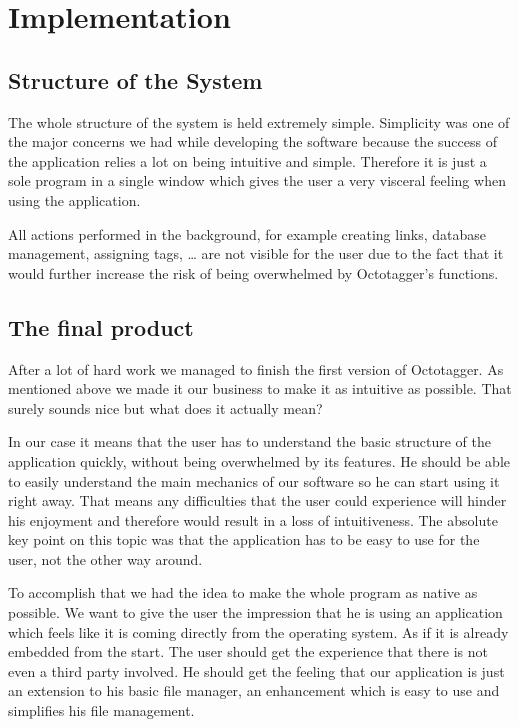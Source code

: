 \section{Implementation}
\def \kapitelautor {Christoph Führer}

\subsection{Structure of the System}
The whole structure of the system is held extremely simple. Simplicity was one of the major concerns we had while developing the software because the success of the application relies a lot on being intuitive and simple. Therefore it is just a sole program in a single window which gives the user a very visceral feeling when using the application.

All actions performed in the background, for example creating links, database management, assigning tags, \ldots{} are not visible for the user due to the fact that it would further increase the risk of being overwhelmed by Octotagger's functions.

\subsection{The final product}
After a lot of hard work we managed to finish the first version of Octotagger. As mentioned above we made it our business to make it as intuitive as possible. That surely sounds nice but what does it actually mean?

In our case it means that the user has to understand the basic structure of the application quickly, without being overwhelmed by its features. He should be able to easily understand the main mechanics of our software so he can start using it right away. That means any difficulties that the user could experience will hinder his enjoyment and therefore would result in a loss of intuitiveness. The absolute key point on this topic was that the application has to be easy to use for the user, not the other way around.

To accomplish that we had the idea to make the whole program as native as possible. We want to give the user the impression that he is using an application which feels like it is coming directly from the operating system. As if it is already embedded from the start. The user should get the experience that there is not even a third party involved. He should get the feeling that our application is just an extension to his basic file manager, an enhancement which is easy to use and simplifies his file management.


